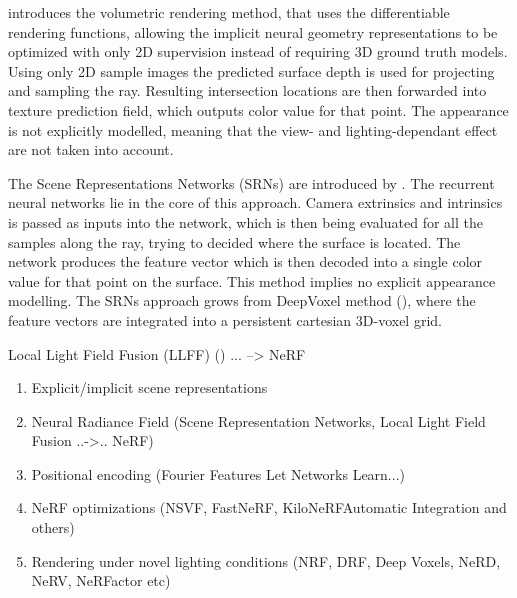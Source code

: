 \cite{niemeyer2020differentiable} introduces the volumetric rendering method,
that uses the differentiable rendering functions,
allowing the implicit neural geometry representations to be optimized
with only 2D supervision instead of requiring 3D ground truth models.
Using only 2D sample images the predicted surface depth is used
for projecting and sampling the ray.
Resulting intersection locations are then forwarded into texture prediction field,
which outputs color value for that point.
The appearance is not explicitly modelled, meaning that the view- and lighting-dependant effect are not taken into account.


The Scene Representations Networks (SRNs) are introduced by \cite{sitzmann2019srns}.
The recurrent neural networks lie in the core of this approach.
Camera extrinsics and intrinsics is passed as inputs into the network,
which is then being evaluated for all the samples along the ray,
trying to decided where the surface is located.
The network produces the feature vector which is then decoded into a single color value for that point on the surface.
This method implies no explicit appearance modelling.
The SRNs approach grows from DeepVoxel method (\cite{sitzmann2019deepvoxels}),
where the feature vectors are integrated into a persistent cartesian 3D-voxel grid.

Local Light Field Fusion (LLFF) (\cite{mildenhall2019local}) ... --> NeRF



{\color{teal}
\begin{enumerate}
    \item Explicit/implicit scene representations
    \item Neural Radiance Field (Scene Representation Networks, Local Light Field Fusion ..->.. NeRF)
    \item Positional encoding (Fourier Features Let Networks Learn...) %
    \item NeRF optimizations (NSVF, FastNeRF, KiloNeRFAutomatic Integration and others)
    \item Rendering under novel lighting conditions (NRF, DRF, Deep Voxels, NeRD, NeRV, NeRFactor etc)
\end{enumerate}
}


